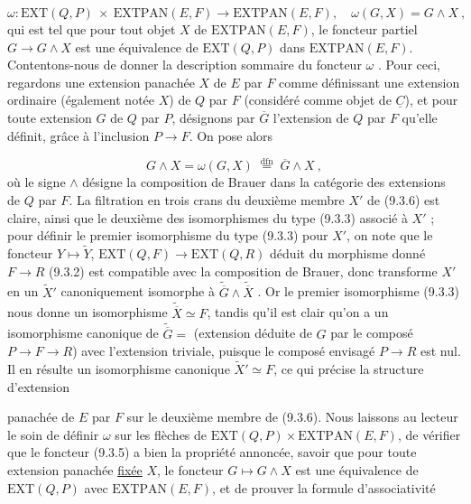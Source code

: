 \begin{equation}\tag{9.3.5}
\omega : \mathrm{EXT}(Q,P) \ \times \ \mathrm{EXTPAN}(E,F) \longrightarrow \mathrm{EXTPAN}(E,F), \quad \omega(G,X) = G \wedge X \ ,
\end{equation}
qui est tel que pour tout objet $X$ de $\mathrm{EXTPAN}(E,F)$, le foncteur partiel $G \longrightarrow G \wedge X$ est une équivalence de $\mathrm{EXT}(Q,P)$ dans $\mathrm{EXTPAN}(E,F)$. Contentons-nous de donner la description sommaire du foncteur $\omega$ . Pour ceci, regardons une extension panachée $X$ de $E$ par $F$ comme définissant une extension ordinaire (également notée $X$) de $Q$ par $F$ (considéré comme objet de $\underline{C}$), et pour toute extension $G$ de $Q$ par $P$, désignons par $\overline{G}$ l'extension de $Q$ par $F$ qu'elle définit, grâce à l'inclusion $P \longrightarrow F$. On pose alors

\begin{equation}\tag{9.3.6}
G \wedge X = \omega(G,X) \;\overset{\mathrm{dfn}}{=}\; \overline{G} \wedge X \ ,
\end{equation}
où le signe $\wedge$ désigne la composition de Brauer dans la catégorie des extensions de $Q$ par $F$. La filtration en trois crans du deuxième membre $X'$ de (9.3.6) est claire, ainsi que le deuxième des isomorphismes du type (9.3.3) associé à $X'$ ; pour définir le premier isomorphisme du type (9.3.3) pour $X'$, on note que le foncteur $Y \longmapsto \widetilde{Y}$, $\mathrm{EXT}(Q,F) \longrightarrow \mathrm{EXT}(Q,R)$ déduit du morphisme donné $F \longrightarrow R$ (9.3.2) est compatible avec la composition de Brauer, donc transforme $X'$ en un $\widetilde{X}'$ canoniquement isomorphe à $\widetilde{\overline{G}} \wedge \widetilde{\overline{X}}$ . Or le premier isomorphisme (9.3.3) nous donne un isomorphisme $\widetilde{\overline{X}} \simeq F$, tandis qu'il est clair qu'on a un isomorphisme canonique de $\widetilde{\overline{G}} =$ (extension déduite de $G$ par le composé $P \longrightarrow F \longrightarrow R$) avec l'extension triviale, puisque le composé envisagé $P \longrightarrow R$ est nul. Il en résulte un isomorphisme canonique $\widetilde{X}' \simeq F$, ce qui précise la structure d'extension



panachée de $E$ par $F$ sur le deuxième membre de (9.3.6). Nous laissons au lecteur le soin de définir $\omega$ sur les flèches de $\mathrm{EXT}(Q,P) \times \mathrm{EXTPAN}(E,F)$, de vérifier que le foncteur (9.3.5) a bien la propriété annoncée, savoir que pour toute extension panachée \underline{fixée} $X$, le foncteur $G \longmapsto G \wedge X$ est une équivalence de $\mathrm{EXT}(Q,P)$ avec $\mathrm{EXTPAN}(E,F)$, et de prouver la formule d'associativité

